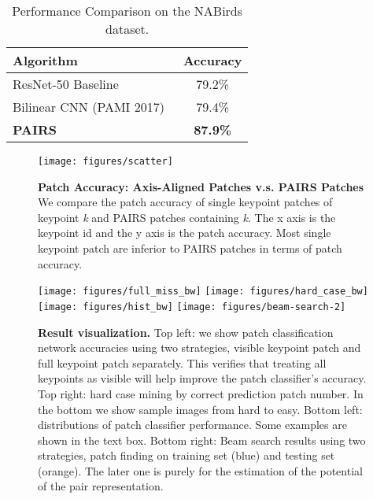 \begin{table}[h]
    \begin{center}
     \caption{Performance Comparison on the NABirds dataset.}
\begin{tabular}{|l|c|}
	\hline
	Algorithm & Accuracy\\
	\hline
    ResNet-50 Baseline & 79.2\% \\
	\hline
    Bilinear CNN (PAMI 2017)~\cite{LinRM_PAMI2017} & 79.4\% \\
    \hline
    {\bf PAIRS} & \bf{87.9\%} \\
	\hline
\end{tabular}

\label{nabirds_table}
\end{center}
\end{table}

\begin{figure}[h]
        \centering
\texttt{[image: figures/scatter]}
        
        \caption{ {\textbf{Patch Accuracy: Axis-Aligned Patches v.s. PAIRS Patches}}
        We compare the patch accuracy of single keypoint patches of keypoint \emph{k} and PAIRS patches containing \emph{k}. The x axis is the keypoint id and the y axis is the patch accuracy. Most single keypoint patch are inferior to PAIRS patches in terms of patch accuracy.}
        \label{fig:scatter}
\end{figure}






\begin{figure*}[h]
        \centering
       \texttt{[image: figures/full\_miss\_bw]}
        \texttt{[image: figures/hard\_case\_bw]}
        \texttt{[image: figures/hist\_bw]}
        \texttt{[image: figures/beam-search-2]}
       
        \caption{\textbf{Result visualization.} Top left: we show patch classification network accuracies using two strategies, visible keypoint patch and full keypoint patch separately. This verifies that treating all keypoints as visible will help improve the patch classifier's accuracy. Top right: hard case mining by correct prediction patch number. In the bottom we show sample images from hard to easy. Bottom left: distributions of patch classifier performance. Some examples are shown in the text box. Bottom right: Beam search results using two strategies, patch finding on training set (blue) and testing set (orange). The later one is purely for the estimation of the potential of the pair representation.
}
\label{fig:many_graph} 
\end{figure*}


